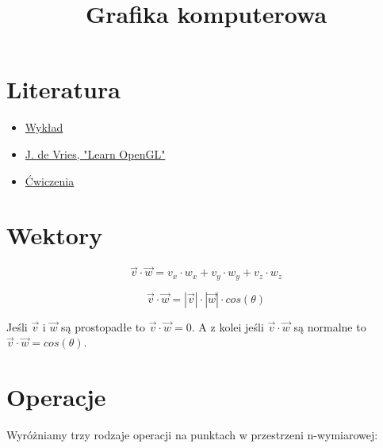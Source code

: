 \documentclass{../notatki}
\title{Grafika komputerowa}
\begin{document}
\tableofcontents

\section{Literatura}

\begin{itemize}
    \item \href{https://wp.faculty.wmi.amu.edu.pl/GRK.html}{Wykład}
    \item \href{https://learnopengl.com/book/book_pdf.pdf}{J. de Vries, "Learn OpenGL"}
    \item \href{https://andkok.faculty.wmi.amu.edu.pl/grk/zad_1/}{Ćwiczenia}
\end{itemize}

\section{Wektory}

$$
\vec{v} \cdot \vec{w} = v_x \cdot w_x + v_y \cdot w_y + v_z \cdot w_z
$$

$$
\vec{v} \cdot \vec{w} = |\vec{v}| \cdot |\vec{w}| \cdot cos(\theta)
$$

Jeśli $\vec{v}$ i $\vec{w}$ są prostopadłe to $\vec{v} \cdot \vec{w} = 0$.
A z kolei jeśli $\vec{v} \cdot \vec{w}$ są normalne to $\vec{v} \cdot \vec{w} = cos(\theta)$.

\section{Operacje}

Wyróżniamy trzy rodzaje operacji na punktach w przestrzeni n-wymiarowej:
\end{document}
